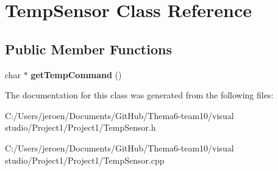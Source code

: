 \hypertarget{class_temp_sensor}{}\section{Temp\+Sensor Class Reference}
\label{class_temp_sensor}
\subsection*{Public Member Functions}
\begin{DoxyCompactItemize}
\item 
char $\ast$ {\bfseries get\+Temp\+Command} ()\hypertarget{class_temp_sensor_af3a019c55b2df306b803e1a7f9ce3f6d}{}\label{class_temp_sensor_af3a019c55b2df306b803e1a7f9ce3f6d}

\end{DoxyCompactItemize}


The documentation for this class was generated from the following files\+:\begin{DoxyCompactItemize}
\item 
C\+:/\+Users/jeroen/\+Documents/\+Git\+Hub/\+Thema6-\/team10/visual studio/\+Project1/\+Project1/Temp\+Sensor.\+h\item 
C\+:/\+Users/jeroen/\+Documents/\+Git\+Hub/\+Thema6-\/team10/visual studio/\+Project1/\+Project1/Temp\+Sensor.\+cpp\end{DoxyCompactItemize}
